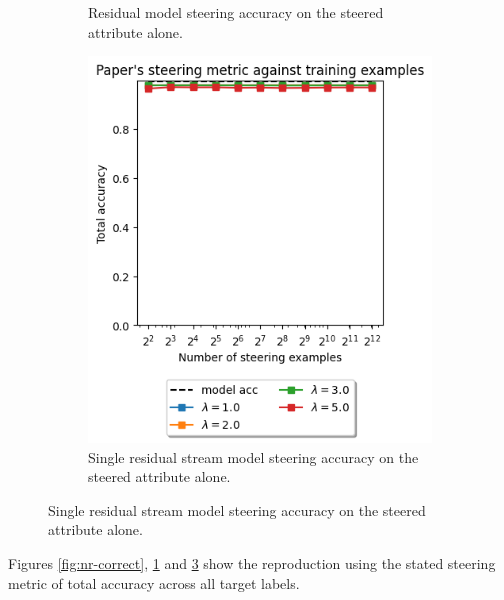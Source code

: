 \begin{figure}
\begin{subfigure}{0.45\textwidth}
        \caption{Residual model steering accuracy on the steered attribute alone.}
        \label{fig:r-correct}
    \end{subfigure}
    \begin{subfigure}{0.45\textwidth}
        \includegraphics[width=\textwidth]{figures/single-residual-full-reproduction.png}
        \caption{Single residual stream model steering accuracy on the steered attribute alone.}
        \label{fig:sr-correct}
    \end{subfigure}
\end{figure}

Figures \ref{fig:nr-correct}, \ref{fig:r-correct} and \ref{fig:sr-correct} show the reproduction using the stated steering metric of total accuracy across all target labels.
